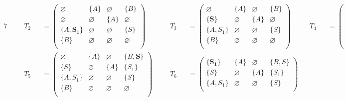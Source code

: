 \begin{figure}[ht]
\begin{alignat*}{7}
& &&T_2 &&= \begin{pmatrix}
\varnothing & \{A\}       & \varnothing & \{B\}       \\
\varnothing & \varnothing & \{A\}       & \varnothing \\
\{A, \pmb{S_1}\}  & \varnothing & \varnothing & \{S\}       \\
\{B\}       & \varnothing & \varnothing & \varnothing \\
\end{pmatrix} \ \ \ \ &&T_3 &&= \begin{pmatrix}
\varnothing & \{A\}       & \varnothing & \{B\}       \\
\{\pmb{S}\}       & \varnothing & \{A\}       & \varnothing \\
\{A, S_1\}  & \varnothing & \varnothing & \{S\}       \\
\{B\}       & \varnothing & \varnothing & \varnothing \\
\end{pmatrix} \ \ \ \ &&T_4 &&= \begin{pmatrix}
\varnothing & \{A\}       & \varnothing & \{B\}       \\
\{S\}       & \varnothing & \{A\}       & \{\pmb{S_1}\}     \\
\{A, S_1\}  & \varnothing & \varnothing & \{S\}       \\
\{B\}       & \varnothing & \varnothing & \varnothing \\
\end{pmatrix}  \\
& &&T_5 &&= \begin{pmatrix}
\varnothing & \{A\}       & \varnothing & \{B, \pmb{S}\}    \\
\{S\}       & \varnothing & \{A\}       & \{S_1\}     \\
\{A, S_1\}  & \varnothing & \varnothing & \{S\}       \\
\{B\}       & \varnothing & \varnothing & \varnothing \\
\end{pmatrix} \ \ \ \ &&T_6 &&= \begin{pmatrix}
\{\pmb{S_1}\}     & \{A\}       & \varnothing & \{B, S\}    \\
\{S\}       & \varnothing & \{A\}       & \{S_1\}     \\
\{A, S_1\}  & \varnothing & \varnothing & \{S\}       \\

\end{pmatrix}
\end{alignat*}
\end{figure}
